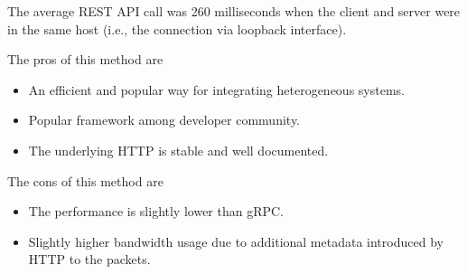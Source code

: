 The average REST API call was 260 milliseconds when the client and server were in the same host (i.e., the connection via loopback interface).

The pros of this method are
\begin{itemize}
	\item An efficient and popular way for integrating heterogeneous systems.
	\item Popular framework among developer community.
	\item The underlying HTTP is stable and well documented.
\end{itemize}

The cons of this method are
\begin{itemize}
	\item The performance is slightly lower than gRPC.
	\item Slightly higher bandwidth usage due to additional metadata introduced by HTTP to the packets.
\end{itemize}
\fi  %
